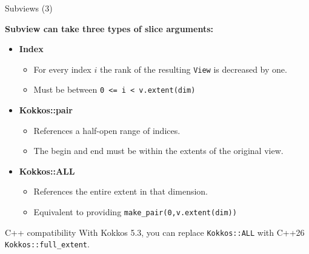 
\begin{frame}[fragile]{Subviews (3)}

\textbf{Subview can take three types of slice arguments:}

\begin{itemize}
\item \textbf{Index}
\begin{itemize}
  \item For every index $i$ the rank of the resulting \texttt{View} is decreased by one.
  \item Must be between \texttt{0 <= i < v.extent(dim)}
\end{itemize}
\item \textbf{Kokkos::pair}
\begin{itemize}
  \item References a half-open range of indices.
  \item The begin and end must be within the extents of the original view. 
\end{itemize}
\item \textbf{Kokkos::ALL}
\begin{itemize}
  \item References the entire extent in that dimension.
  \item Equivalent to providing \texttt{make\_pair(0,v.extent(dim))}
\end{itemize}
\end{itemize}

\begin{block}{C++ compatibility}
  With Kokkos 5.3, you can replace \texttt{Kokkos::ALL} with C++26 \texttt{Kokkos::full\_extent}.
\end{block}

\end{frame}

